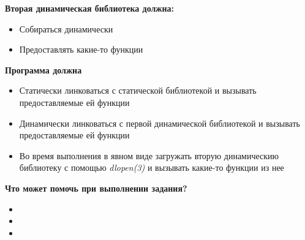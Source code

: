 \documentclass[../../lectures.tex]{subfiles}
\begin{document}
\textbf{Вторая динамическая библиотека должна:}
\begin{itemize}
    \item Собираться динамически
    \item Предоставлять какие-то функции
\end{itemize}

\textbf{Программа должна}
\begin{itemize}
    \item Статически линковаться с статической библиотекой и вызывать предоставляемые ей функции
    \item Динамически линковаться с первой динамической библиотекой и вызывать предоставляемые ей функции
    \item Во время выполнения в явном виде загружать вторую динамическию библиотеку с помощью \emph{dlopen(3)} и вызывать какие-то функции из нее
\end{itemize}

\textbf{Что может помочь при выполнении задания?}
\begin{itemize}
    \item {}
    \item {}
    \item {}
\end{itemize}
\end{document}
